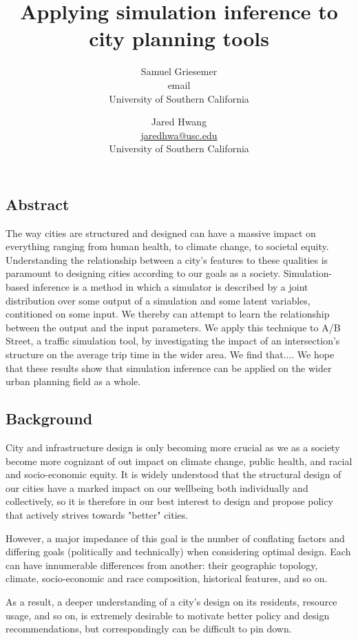 \documentclass[]{article}
\title{Applying simulation inference to city planning tools}\label{Applying simulation inference to city planning}
\author{Samuel Griesemer \\ email \\ University of Southern California \\
   \and Jared Hwang \\ \href{mailto:jaredhwa@usc.edu}{jaredhwa@usc.edu} \\ University of Southern California}
\date{}
\begin{document}
\maketitle


\hypertarget{Abstract}{%
\subsection{Abstract}\label{Abstract}}

The way cities are structured and designed can have a massive impact on 
everything ranging from human health, to climate change, to societal equity. 
Understanding the relationship between a city's features to these qualities 
is paramount to designing cities according to our goals as a society. 
Simulation-based inference is a method in which a simulator is described by 
a joint distribution over some output of a simulation and some latent variables, 
contitioned on some input. We thereby can attempt to learn the relationship between
the output and the input parameters. We apply this technique to A/B Street, a traffic
simulation tool, by investigating the impact of an intersection's structure on the
average trip time in the wider area. We find that.... We hope that these results 
show that simulation inference can be applied on the wider urban planning
field as a whole.


\hypertarget{background}{%
\subsection{Background}\label{background}}

City and infrastructure design is only becoming more crucial as we as a
society become more cognizant of out impact on climate change, public
health, and racial and socio-economic equity. It is widely understood that 
the structural design of our cities have a marked impact on our wellbeing 
both individually and collectively, so it is therefore in our best interest 
to design and propose policy that actively strives towards "better" cities.

However, a major impedance of this goal is the number of conflating factors 
and differing goals (politically and technically) when considering optimal 
design. Each can have innumerable differences from another: their geographic 
topology, climate, socio-economic and race composition, historical features, 
and so on. 

As a result, a deeper understanding of a city's design on its residents, resource 
usage, and so on, is extremely desirable to motivate better policy and design 
recommendations, but correspondingly can be difficult to pin down. 
\end{document}
